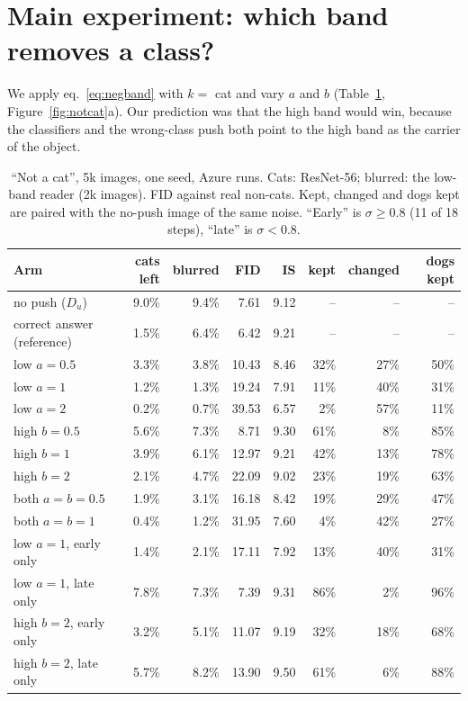\documentclass[11pt]{article}
\begin{document}
\section{Main experiment: which band removes a class?}
\label{sec:neg}

We apply eq.~\eqref{eq:negband} with $k = $ cat and vary $a$ and $b$ (Table~\ref{tab:notcat},
Figure~\ref{fig:notcat}a). Our prediction was that the high band would win, because the classifiers and the
wrong-class push both point to the high band as the carrier of the object.

\begin{table}[t]
  \centering
  \small
  \caption{``Not a cat'', 5k images, one seed, Azure runs. Cats: ResNet-56; blurred: the low-band reader (2k images).
  FID against real non-cats. Kept, changed and dogs kept are paired with the no-push image of the same noise.
  ``Early'' is $\sigma \geq 0.8$ (11 of 18 steps), ``late'' is $\sigma < 0.8$.}
  \label{tab:notcat}
  \begin{tabular}{lrrrrrrr}
    \toprule
    Arm & cats left & blurred & FID & IS & kept & changed & dogs kept \\
    \midrule
    no push ($D_u$)                  & 9.0\% & 9.4\% & 7.61 & 9.12 & -- & -- & -- \\
    correct answer (reference)       & 1.5\% & 6.4\% & 6.42 & 9.21 & -- & -- & -- \\
    \midrule
    low $a = 0.5$                    & 3.3\% & 3.8\% & 10.43 & 8.46 & 32\% & 27\% & 50\% \\
    low $a = 1$                      & 1.2\% & 1.3\% & 19.24 & 7.91 & 11\% & 40\% & 31\% \\
    low $a = 2$                      & 0.2\% & 0.7\% & 39.53 & 6.57 & 2\% & 57\% & 11\% \\
    high $b = 0.5$                   & 5.6\% & 7.3\% & 8.71 & 9.30 & 61\% & 8\% & 85\% \\
    high $b = 1$                     & 3.9\% & 6.1\% & 12.97 & 9.21 & 42\% & 13\% & 78\% \\
    high $b = 2$                     & 2.1\% & 4.7\% & 22.09 & 9.02 & 23\% & 19\% & 63\% \\
    both $a = b = 0.5$               & 1.9\% & 3.1\% & 16.18 & 8.42 & 19\% & 29\% & 47\% \\
    both $a = b = 1$                 & 0.4\% & 1.2\% & 31.95 & 7.60 & 4\% & 42\% & 27\% \\
    \midrule
    low $a = 1$, early only          & 1.4\% & 2.1\% & 17.11 & 7.92 & 13\% & 40\% & 31\% \\
    low $a = 1$, late only           & 7.8\% & 7.3\% & 7.39 & 9.31 & 86\% & 2\% & 96\% \\
    high $b = 2$, early only         & 3.2\% & 5.1\% & 11.07 & 9.19 & 32\% & 18\% & 68\% \\
    high $b = 2$, late only          & 5.7\% & 8.2\% & 13.90 & 9.50 & 61\% & 6\% & 88\% \\
    \bottomrule
  \end{tabular}
\end{table}
\end{document}
